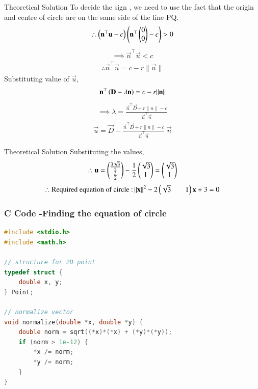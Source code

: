 \documentclass{beamer}
\begin{document}
\begin{frame}{Theoretical Solution}
To decide the sign , we need to use the fact that the origin and centre of circle are on the same side of the line PQ.
\begin{align}
    \therefore \left(\mathbf{n}^{\top}\mathbf{u}-c\right)\left(\mathbf{n}^{\top}\begin{pmatrix}0\\0\end{pmatrix}-c\right)>0
\end{align}
\begin{align}
    \implies \vec{n}^{\top}\vec{u}<c
\end{align}
\begin{align}
    \therefore \vec{n}^{\top}\vec{u}=c-r\|\vec{n}\|
\end{align}
Substituting value of $\vec{u}$,
\begin{align}
\mathbf{n}^{\top}\left(\mathbf{D}-\lambda\mathbf{n}\right)=c-r\|\mathbf{n}\|
\end{align}
\begin{align}
    \implies \lambda=\frac{\vec{n}^{\top}\vec{D}+r\|n\|-c}{\vec{n}^{\top}\vec{n}}
\end{align}
\begin{align}
    \vec{u}=\vec{D}-\frac{\vec{n}^{\top}\vec{D}+r\|n\|-c}{\vec{n}^{\top}\vec{n}}\;\vec{n}
\end{align}
\end{frame}

\begin{frame}{Theoretical Solution}
Substituting the values,
\begin{align}
    \therefore \mathbf{u}=\begin{pmatrix}\frac{3\sqrt{3}}{2}\\\frac{3}{2}\end{pmatrix}
-\frac{1}{2}\begin{pmatrix}\sqrt{3}\\1\end{pmatrix}=\begin{pmatrix}\sqrt{3}\\1\end{pmatrix}
\end{align}
\begin{align}
    \therefore \text{Required equation of circle :\,}\|\mathbf{x}\|^2-2\begin{pmatrix}\sqrt{3}&&1\end{pmatrix}\mathbf{x}+3=0
\end{align}
\end{frame}

\begin{frame}[fragile]
    \frametitle{C Code -Finding the equation of circle}

    \begin{lstlisting}[language=C]
#include <stdio.h>
#include <math.h>

// structure for 2D point
typedef struct {
    double x, y;
} Point;

// normalize vector
void normalize(double *x, double *y) {
    double norm = sqrt((*x)*(*x) + (*y)*(*y));
    if (norm > 1e-12) {
        *x /= norm;
        *y /= norm;
    }
}
    \end{lstlisting}
\end{frame}
\end{document}
